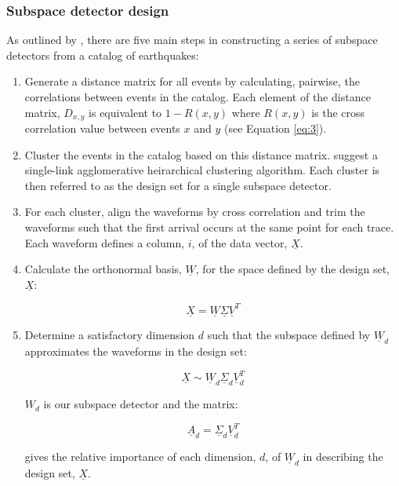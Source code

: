 \subsubsection{Subspace detector design}
As outlined by \citet{Harris_2006a}, there are five main steps in constructing a series of subspace detectors from a catalog of earthquakes:
\begin{enumerate}
    \item Generate a distance matrix for all events by calculating, pairwise, the correlations between events in the catalog. Each element of the distance matrix, $D_{x, y}$ is equivalent to $1 - R(x, y)$ where $R(x, y)$ is the cross correlation value between events $x$ and $y$ (see Equation \ref{eq:3}).
    \item Cluster the events in the catalog based on this distance matrix. \citet{Harris_2006a} suggest a single-link agglomerative heirarchical clustering algorithm. Each cluster is then referred to as the design set for a single subspace detector.
    \item For each cluster, align the waveforms by cross correlation and trim the waveforms such that the first arrival occurs at the same point for each trace. Each waveform defines a column, $i$, of the data vector, $\underline{X}$.
    \item Calculate the orthonormal basis, $\underline{W}$, for the space defined by the design set, $\underline{X}$:

    \begin{equation}
    \underline{X} = \underline{W} \underline{\Sigma} \underline{V}^{T}
    \end{equation}
    
    \item Determine a satisfactory dimension $d$ such that the subspace defined by $\underline{W}_{d}$ approximates the waveforms in the design set:
    
    \begin{equation}
    \underline{X} \sim \underline{W}_{d} \underline{\Sigma}_{d} \underline{V}_{d}^{T}
    \end{equation}
    
    $W_{d}$ is our subspace detector and the matrix:
    
    \begin{equation}
    \underline{A}_{d} = \underline{\Sigma}_{d}\underline{V}_{d}^{T}
    \end{equation}
    
    gives the relative importance of each dimension, $d$, of $\underline{W}_{d}$ in describing the design set, $\underline{X}$.
\end{enumerate}

